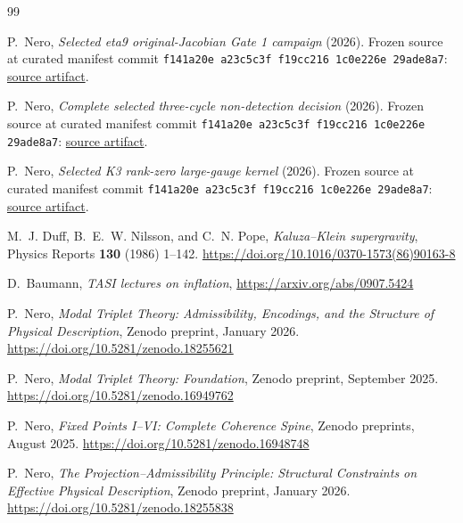 \documentclass[11pt]{article}
\begin{document}
\begin{thebibliography}{99}

P.~Nero, \emph{Selected eta9 original-Jacobian Gate 1 campaign} (2026).
Frozen source at curated manifest commit
\texttt{f141a20e a23c5c3f f19cc216 1c0e226e 29ade8a7}:
\href{https://github.com/PeterNero/mtt-results-repro/blob/f141a20ea23c5c3ff19cc2161c0e226e29ade8a7/release/results/eta9_gate1_campaign/artifact.json}{source artifact}.

P.~Nero, \emph{Complete selected three-cycle non-detection decision} (2026).
Frozen source at curated manifest commit
\texttt{f141a20e a23c5c3f f19cc216 1c0e226e 29ade8a7}:
\href{https://github.com/PeterNero/mtt-results-repro/blob/f141a20ea23c5c3ff19cc2161c0e226e29ade8a7/release/results/eta9_three_cycle_b96_nondetection/artifact.json}{source artifact}.

P.~Nero, \emph{Selected K3 rank-zero large-gauge kernel} (2026).
Frozen source at curated manifest commit
\texttt{f141a20e a23c5c3f f19cc216 1c0e226e 29ade8a7}:
\href{https://github.com/PeterNero/mtt-results-repro/blob/f141a20ea23c5c3ff19cc2161c0e226e29ade8a7/release/results/q79_bk3_rank_zero_kernel/artifact.json}{source artifact}.

M.~J. Duff, B.~E.~W. Nilsson, and C.~N. Pope,
\emph{Kaluza--Klein supergravity},
Physics Reports \textbf{130} (1986) 1--142.
\url{https://doi.org/10.1016/0370-1573(86)90163-8}

D.~Baumann,
\emph{TASI lectures on inflation},
\url{https://arxiv.org/abs/0907.5424}

P.~Nero,
\emph{Modal Triplet Theory: Admissibility, Encodings, and the Structure of Physical Description},
Zenodo preprint, January 2026.
\url{https://doi.org/10.5281/zenodo.18255621}

P.~Nero,
\emph{Modal Triplet Theory: Foundation},
Zenodo preprint, September 2025.
\url{https://doi.org/10.5281/zenodo.16949762}

P.~Nero,
\emph{Fixed Points I--VI: Complete Coherence Spine},
Zenodo preprints, August 2025.
\url{https://doi.org/10.5281/zenodo.16948748}

P.~Nero,
\emph{The Projection--Admissibility Principle: Structural Constraints on Effective Physical Description},
Zenodo preprint, January 2026.
\url{https://doi.org/10.5281/zenodo.18255838}


\end{thebibliography}
\end{document}
